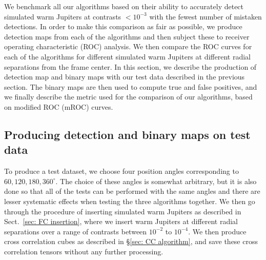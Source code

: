 \documentclass{aa}
\begin{document}
We benchmark all our algorithms based on their ability to accurately detect simulated warm Jupiters at contrasts $<10^{-3}$ with the fewest number of mistaken detections.
In order to make this comparison as fair as possible, we produce detection maps from each of the algorithms and then subject these to receiver operating characteristic (ROC) analysis.
We then compare the ROC curves for each of the algorithms for different simulated warm Jupiters at different radial separations from the frame center.
In this section, we describe the production of detection map and binary maps with our test data described in the previous section.
The binary maps are then used to compute true and false positives, and we finally describe the metric used for the comparison of our algorithms, based on modified ROC (mROC) curves.


\subsection{Producing detection and binary maps on test data}\label{sec:testdata}

To produce a test dataset, we choose four position angles corresponding to $60,120,180,360^{\circ}$.
The choice of these angles is somewhat arbitrary, but it is also done so that all of the tests can be performed with the same angles and there are lesser systematic effects when testing the three algorithms together.
We then go through the procedure of inserting simulated warm Jupiters as described in Sect.~\ref{sec: FC insertion}, where we insert warm Jupiters at different radial separations over a range of contrasts between $10^{-2}$ to $10^{-4}$. We then produce cross correlation cubes as described in \S\ref{sec: CC algorithm}, and save these cross correlation tensors without any further processing.
\end{document}
